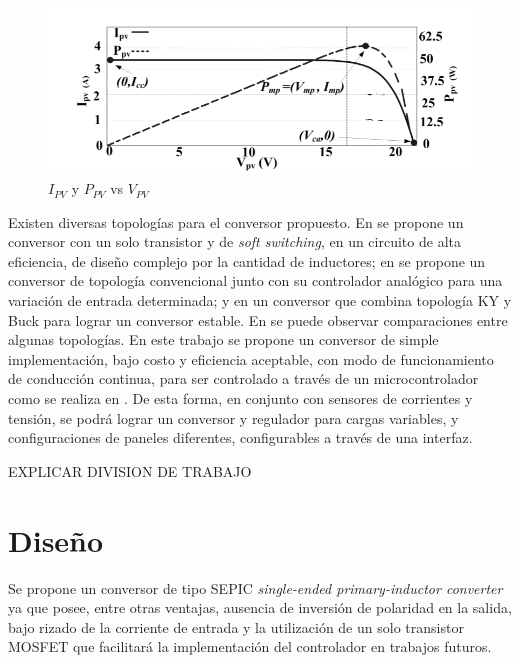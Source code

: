         \begin{figure}[htbp]
            \centering
            \includegraphics[scale = 0.25]{Figuras/Curva_MPPT.png}
            \caption{$I_{PV}$ y $P_{PV}$ vs $V_{PV}$ \cite{gallardo2014diseno}  }
            \label{fig: Curva MPPT}
        \end{figure}
    
    Existen diversas topologías para el conversor propuesto. En \cite{Kiran} se propone un conversor con un solo transistor y  de \textit{soft switching}, en \cite{9106477} un circuito de alta eficiencia, de diseño complejo por la cantidad de inductores; en \cite{5701795} se propone un conversor de topología convencional junto con su controlador analógico para una variación de entrada determinada; y en \cite{6119227} un conversor que combina topología KY y Buck para lograr un conversor estable. En \cite{954206} se puede observar comparaciones entre algunas topologías. En este trabajo se propone un conversor de simple implementación, bajo costo y eficiencia aceptable, con modo de funcionamiento de conducción continua, para ser controlado a través de un microcontrolador como se realiza en \cite{Chang}. De esta forma, en conjunto con sensores de corrientes y tensión, se podrá lograr un conversor y regulador para cargas variables, y configuraciones de paneles diferentes, configurables a través de una interfaz.
 
    EXPLICAR DIVISION DE TRABAJO 
 
\section{Diseño}
    
    Se propone un conversor de tipo SEPIC \textit{single-ended primary-inductor converter} ya que posee, entre otras ventajas, ausencia de inversión de polaridad en la salida, bajo rizado de la corriente de entrada \cite{alvarez2019caracterizacion} y la utilización de un solo transistor MOSFET que facilitará la implementación del controlador en trabajos futuros. 
       
